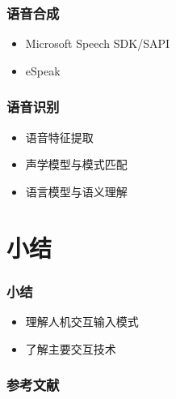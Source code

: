 \documentclass{beamer}
\begin{document}
\begin{frame}
	\frametitle{语音合成}
	\begin{itemize}
		\item Microsoft Speech SDK/SAPI
		\item eSpeak
	\end{itemize}
\end{frame}

\begin{frame}
	\frametitle{语音识别}
	\begin{itemize}
		\item 语音特征提取
		\item 声学模型与模式匹配
		\item 语言模型与语义理解
	\end{itemize}
\end{frame}

%

\section{小结}
\begin{frame}
	\frametitle{小结}
	\begin{itemize}
		\item 理解人机交互输入模式
		\item 了解主要交互技术
	\end{itemize}
\end{frame}
 
\begin{frame}
	\frametitle{参考文献}
	
	
\end{frame}
\end{document}
